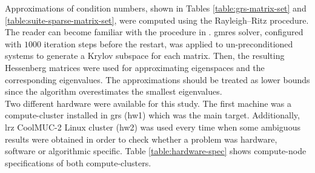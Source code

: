 Approximations of condition numbers, shown in Tables \ref{table:grs-matrix-set} and \ref{table:suite-sparse-matrix-set},  were computed using the Rayleigh–Ritz procedure. The reader can become familiar with the procedure in \cite{rayleigh-ritz-procedure}. \acrshort{gmres} solver, configured with $1000$ iteration steps before the restart, was applied to un-preconditioned systems to generate a Krylov subspace for each matrix. Then, the resulting Hessenberg matrices were used for approximating eigenspaces and the corresponding eigenvalues. The approximations should be treated as lower bounds since the algorithm overestimates the smallest eigenvalues.\\




Two different hardware were available for this study. The first machine was a compute-cluster installed in \acrshort{grs} (\gls{hw1}) which was the main target. Additionally, \acrshort{lrz} CoolMUC-2 Linux cluster (\gls{hw2}) was used every time when some ambiguous results were obtained in order to check whether a problem was hardware, software or algorithmic specific. Table \ref{table:hardware-spec} shows compute-node specifications of both compute-clusters.\\


